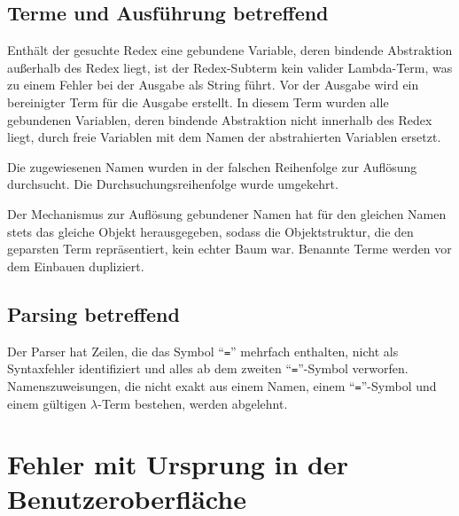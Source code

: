 \documentclass[parskip=full,11pt,openany]{scrreprt}
\begin{document}
\subsection{Terme und Ausführung betreffend}
\begin{itemize}[itemsep=3ex]
	{Enthält der gesuchte Redex eine gebundene Variable, deren bindende Abstraktion außerhalb des Redex liegt, ist der Redex-Subterm kein valider Lambda-Term, was zu einem Fehler bei der Ausgabe als String führt.}
	{Vor der Ausgabe wird ein bereinigter Term für die Ausgabe erstellt. In diesem Term wurden alle gebundenen Variablen, deren bindende Abstraktion nicht innerhalb des Redex liegt, durch freie Variablen mit dem Namen der abstrahierten Variablen ersetzt.}
	
	{Die zugewiesenen Namen wurden in der falschen Reihenfolge zur Auflösung durchsucht.}
	{Die Durchsuchungsreihenfolge wurde umgekehrt.}
	
	{Der Mechanismus zur Auflösung gebundener Namen hat für den gleichen Namen stets das gleiche Objekt
		herausgegeben, sodass die Objektstruktur, die den geparsten Term repräsentiert, kein echter Baum war.}
	{Benannte Terme werden vor dem Einbauen dupliziert.}
\end{itemize}

\subsection{Parsing betreffend}
\begin{itemize}[itemsep=3ex]
	{Der Parser hat Zeilen, die das Symbol \enquote{\texttt{=}} mehrfach enthalten, nicht als Syntaxfehler identifiziert und
		alles ab dem zweiten \enquote{\texttt{=}}-Symbol verworfen.}
	{Namenszuweisungen, die nicht exakt aus einem Namen, einem \enquote{\texttt{=}}-Symbol und einem gültigen
		$\lambda$-Term bestehen, werden abgelehnt.}
\end{itemize}

\section{Fehler mit Ursprung in der Benutzeroberfläche}
\end{document}
